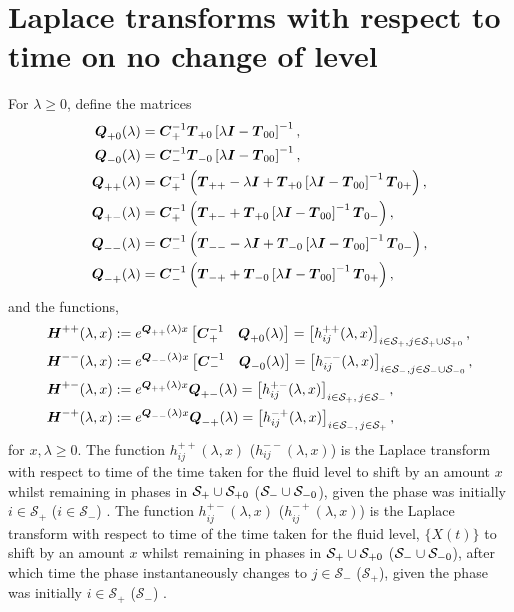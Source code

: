 \section{Laplace transforms with respect to time on no change of level}\label{sec: lst on no change}
For \(\lambda \geq 0\), define the matrices
\begin{align*}
	\boldsymbol Q_{+0}(\lambda) &= \boldsymbol C_+^{-1}\boldsymbol T_{+0}\left[\lambda \boldsymbol I - \boldsymbol T_{00}\right]^{-1},
	\\\boldsymbol Q_{-0}(\lambda) &= \boldsymbol C_-^{-1}\boldsymbol T_{-0}\left[\lambda \boldsymbol I - \boldsymbol T_{00}\right]^{-1},
	\\\boldsymbol Q_{++}(\lambda) &= \boldsymbol C_+^{-1} \left(\boldsymbol T_{++} - \lambda \boldsymbol I + \boldsymbol T_{+0}\left[\lambda \boldsymbol I - \boldsymbol T_{00}\right]^{-1}\boldsymbol T_{0+}\right),
	\\\boldsymbol Q_{+-}(\lambda) &= \boldsymbol C_+^{-1} \left(\boldsymbol T_{+-} + \boldsymbol T_{+0}\left[\lambda \boldsymbol I - \boldsymbol T_{00}\right]^{-1}\boldsymbol T_{0-} \right) ,
	\\\boldsymbol Q_{--}(\lambda) &= \boldsymbol C_-^{-1} \left(\boldsymbol T_{--}  - \lambda \boldsymbol I + \boldsymbol T_{-0}\left[\lambda \boldsymbol I - \boldsymbol T_{00}\right]^{-1}\boldsymbol T_{0-}\right),
	\\\boldsymbol Q_{-+}(\lambda) &=\boldsymbol C_-^{-1} \left(\boldsymbol T_{-+}+ \boldsymbol T_{-0}\left[\lambda \boldsymbol I - \boldsymbol T_{00}\right]^{-1}\boldsymbol T_{0+}\right) ,
\end{align*}
and the functions,
\begin{align}
	\boldsymbol H^{++}(\lambda,x) &:= e^{\boldsymbol{Q}_{++}(\lambda)x}\begin{bmatrix} \boldsymbol C_+^{-1} & \boldsymbol Q_{+0}(\lambda) \end{bmatrix} = \left[h_{ij}^{++}(\lambda,x)\right]_{i\in \mathcal S_+,j\in\mathcal S_{+}\cup\mathcal{S}_{+0}}, \label{eqn: lst 1}
	\\\boldsymbol H^{--}(\lambda,x) &:= e^{\boldsymbol{Q}_{--}(\lambda)x}\begin{bmatrix} \boldsymbol C_-^{-1} & \boldsymbol Q_{-0}(\lambda) \end{bmatrix} = \left[h_{ij}^{--}(\lambda,x)\right]_{i\in\mathcal S_-,j\in\mathcal S_{-}\cup\mathcal{S}_{-0}},
	\\\boldsymbol H^{+-}(\lambda,x) &:= e^{\boldsymbol{Q}_{++}(\lambda)x}\boldsymbol{Q}_{+-}(\lambda) = \left[h_{ij}^{+-}(\lambda,x)\right]_{i\in\mathcal S_+,\,j\in\mathcal S_-}, 
	\\\boldsymbol H^{-+}(\lambda,x) &:= e^{\boldsymbol{Q}_{--}(\lambda)x}\boldsymbol{Q}_{-+}(\lambda) = \left[h_{ij}^{-+}(\lambda,x)\right]_{i\in\mathcal S_-,\, j\in\mathcal S_+}, \label{eqn: lst 4}
\end{align}
for \(x,\lambda\geq 0\). The function \(h_{ij}^{++}(\lambda,x)\) (\(h_{ij}^{--}(\lambda,x)\)) is the Laplace transform with respect to time of the time taken for the fluid level to shift by an amount \(x\) whilst remaining in phases in \(\mathcal S_+\cup\mathcal{S}_{+0}\) (\(\mathcal S_-\cup\mathcal{S}_{-0}\)), given the phase was initially \(i\in\mathcal S_+\) (\(i\in\mathcal S_-\)) \citep{bean2005}. The function \(h_{ij}^{+-}(\lambda,x)\) (\(h_{ij}^{-+}(\lambda,x)\)) is the Laplace transform with respect to time of the time taken for the fluid level, \(\{X(t)\}\) to shift by an amount \(x\) whilst remaining in phases in \(\mathcal S_+\cup\mathcal{S}_{+0}\) (\(\mathcal S_-\cup\mathcal{S}_{-0}\)), after which time the phase instantaneously changes to \(j\in\mathcal S_-\) (\(\mathcal S_+\)), given the phase was initially \(i\in\mathcal S_+\) (\(\mathcal S_-\)) \citep{bean2005}.

